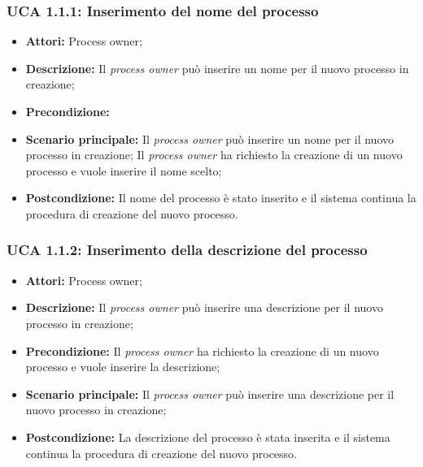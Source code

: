 \hypertarget{A1.1.1}{}
\subsubsection{UCA 1.1.1: Inserimento del nome del processo}
\begin{itemize}
\item \textbf{Attori:} Process owner;
\item \textbf{Descrizione:}
Il \textit{process owner} può inserire un nome per il nuovo processo in creazione;
\item \textbf{Precondizione:}
\item \textbf{Scenario principale:} Il \textit{process owner} può inserire un nome per il nuovo processo in creazione;
Il \textit{process owner} ha richiesto la creazione di un nuovo processo e vuole inserire il nome scelto;
\item \textbf{Postcondizione:}
Il nome del processo è stato inserito e il sistema continua la procedura di creazione del nuovo processo.
\end{itemize}

\hypertarget{A1.1.2}{}
\subsubsection{UCA 1.1.2: Inserimento della descrizione del processo}

\begin{itemize}
\item \textbf{Attori:} Process owner;
\item \textbf{Descrizione:}
Il \textit{process owner} può inserire una descrizione per il nuovo processo in creazione;
\item \textbf{Precondizione:}
Il \textit{process owner} ha richiesto la creazione di un nuovo processo e vuole inserire la descrizione;
\item \textbf{Scenario principale:} Il \textit{process owner} può inserire una descrizione per il nuovo processo in creazione;
\item \textbf{Postcondizione:}
La descrizione del processo è stata inserita e il sistema continua la procedura di creazione del nuovo processo.
\end{itemize}

\hypertarget{A1.2}{}
